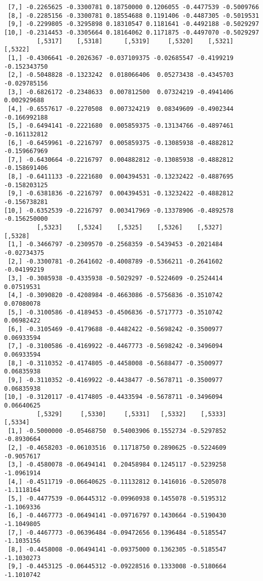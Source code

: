 \documentclass[
  letterpaper,
  DIV=11,
  numbers=noendperiod]{scrreprt}
\begin{document}
\begin{verbatim}
 [7,] -0.2265625 -0.3300781 0.18750000 0.1206055 -0.4477539 -0.5009766
 [8,] -0.2285156 -0.3300781 0.18554688 0.1191406 -0.4487305 -0.5019531
 [9,] -0.2299805 -0.3295898 0.18310547 0.1181641 -0.4492188 -0.5029297
[10,] -0.2314453 -0.3305664 0.18164062 0.1171875 -0.4497070 -0.5029297
         [,5317]    [,5318]      [,5319]     [,5320]    [,5321]      [,5322]
 [1,] -0.4306641 -0.2026367 -0.037109375 -0.02685547 -0.4199219 -0.152343750
 [2,] -0.5048828 -0.1323242  0.018066406  0.05273438 -0.4345703 -0.029785156
 [3,] -0.6826172 -0.2348633  0.007812500  0.07324219 -0.4941406  0.002929688
 [4,] -0.6557617 -0.2270508  0.007324219  0.08349609 -0.4902344 -0.166992188
 [5,] -0.6494141 -0.2221680  0.005859375 -0.13134766 -0.4897461 -0.161132812
 [6,] -0.6459961 -0.2216797  0.005859375 -0.13085938 -0.4882812 -0.159667969
 [7,] -0.6430664 -0.2216797  0.004882812 -0.13085938 -0.4882812 -0.158691406
 [8,] -0.6411133 -0.2221680  0.004394531 -0.13232422 -0.4887695 -0.158203125
 [9,] -0.6381836 -0.2216797  0.004394531 -0.13232422 -0.4882812 -0.156738281
[10,] -0.6352539 -0.2216797  0.003417969 -0.13378906 -0.4892578 -0.156250000
         [,5323]    [,5324]    [,5325]    [,5326]    [,5327]     [,5328]
 [1,] -0.3466797 -0.2309570 -0.2568359 -0.5439453 -0.2021484 -0.02734375
 [2,] -0.3300781 -0.2641602 -0.4008789 -0.5366211 -0.2641602 -0.04199219
 [3,] -0.3085938 -0.4335938 -0.5029297 -0.5224609 -0.2524414  0.07519531
 [4,] -0.3090820 -0.4208984 -0.4663086 -0.5756836 -0.3510742  0.07080078
 [5,] -0.3100586 -0.4189453 -0.4506836 -0.5717773 -0.3510742  0.06982422
 [6,] -0.3105469 -0.4179688 -0.4482422 -0.5698242 -0.3500977  0.06933594
 [7,] -0.3100586 -0.4169922 -0.4467773 -0.5698242 -0.3496094  0.06933594
 [8,] -0.3110352 -0.4174805 -0.4458008 -0.5688477 -0.3500977  0.06835938
 [9,] -0.3110352 -0.4169922 -0.4438477 -0.5678711 -0.3500977  0.06835938
[10,] -0.3120117 -0.4174805 -0.4433594 -0.5678711 -0.3496094  0.06640625
         [,5329]     [,5330]     [,5331]   [,5332]    [,5333]    [,5334]
 [1,] -0.5000000 -0.05468750  0.54003906 0.1552734 -0.5297852 -0.8930664
 [2,] -0.4658203 -0.06103516  0.11718750 0.2890625 -0.5224609 -0.9057617
 [3,] -0.4580078 -0.06494141  0.20458984 0.1245117 -0.5239258 -1.0961914
 [4,] -0.4511719 -0.06640625 -0.11132812 0.1416016 -0.5205078 -1.1118164
 [5,] -0.4477539 -0.06445312 -0.09960938 0.1455078 -0.5195312 -1.1069336
 [6,] -0.4467773 -0.06494141 -0.09716797 0.1430664 -0.5190430 -1.1049805
 [7,] -0.4467773 -0.06396484 -0.09472656 0.1396484 -0.5185547 -1.1035156
 [8,] -0.4458008 -0.06494141 -0.09375000 0.1362305 -0.5185547 -1.1030273
 [9,] -0.4453125 -0.06445312 -0.09228516 0.1333008 -0.5180664 -1.1010742

\end{verbatim}
\end{document}
